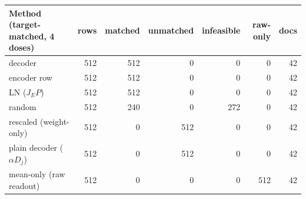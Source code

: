 \begin{tabular}{lrrrrrr}
\toprule
Method (target-matched, 4 doses) & rows & matched & unmatched & infeasible & raw-only & docs \\
\midrule
decoder & 512 & 512 & 0 & 0 & 0 & 42 \\
encoder row & 512 & 512 & 0 & 0 & 0 & 42 \\
LN ($J_EP$) & 512 & 512 & 0 & 0 & 0 & 42 \\
random & 512 & 240 & 0 & 272 & 0 & 42 \\
rescaled (weight-only) & 512 & 0 & 512 & 0 & 0 & 42 \\
plain decoder ($\alpha D_j$) & 512 & 0 & 512 & 0 & 0 & 42 \\
mean-only (raw readout) & 512 & 0 & 0 & 0 & 512 & 42 \\
\bottomrule
\end{tabular}
